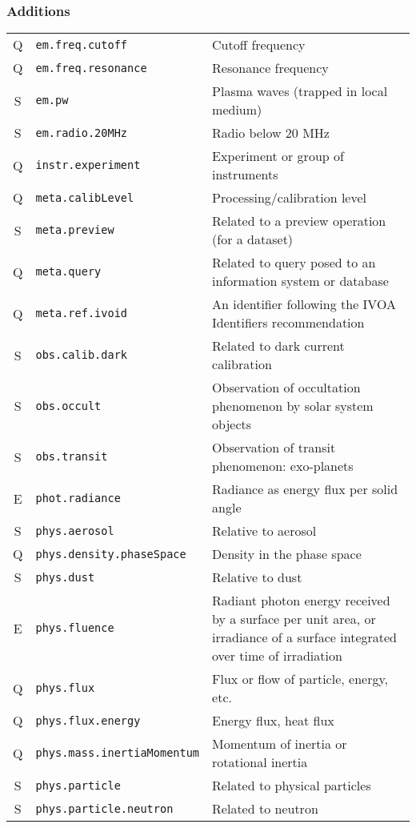 \documentclass[11pt,a4paper]{ivoa}
\begin{document}
\subsubsection*{Additions}
\footnotesize\begin{longtable}[h!]{c|p{40ex}|p{}}
\sptablerule
Q & {\tt em.freq.cutoff} & Cutoff frequency\\
Q & {\tt em.freq.resonance} & Resonance frequency\\
S & {\tt em.pw} & Plasma waves (trapped in local medium)\\
S & {\tt em.radio.20MHz} & Radio below 20 MHz\\
Q & {\tt instr.experiment} & Experiment or group of instruments\\
Q & {\tt meta.calibLevel} & Processing/calibration level\\
S & {\tt meta.preview} & Related to a preview operation (for a dataset)\\
Q & {\tt meta.query} & Related to query posed to an information system or database\\
Q & {\tt meta.ref.ivoid} & An identifier following the IVOA Identifiers recommendation\\
S & {\tt obs.calib.dark} & Related to dark current calibration\\
S & {\tt obs.occult} & Observation of occultation phenomenon by solar system objects\\
S & {\tt obs.transit} & Observation of transit phenomenon: exo-planets\\
E & {\tt phot.radiance} & Radiance as energy flux per solid angle\\
S & {\tt phys.aerosol} & Relative to aerosol\\
Q & {\tt phys.density.phaseSpace} & Density in the phase space\\
S & {\tt phys.dust} & Relative to dust\\
E & {\tt phys.fluence} & Radiant photon energy received by a surface per unit area, or irradiance of a surface integrated over time of irradiation\\
Q & {\tt phys.flux} & Flux or flow of particle, energy, etc.\\
Q & {\tt phys.flux.energy} & Energy flux, heat flux\\
Q & {\tt phys.mass.inertiaMomentum} & Momentum of inertia or rotational inertia\\
S & {\tt phys.particle} & Related to physical particles\\
S & {\tt phys.particle.neutron} & Related to neutron\\

\end{longtable}
\end{document}
